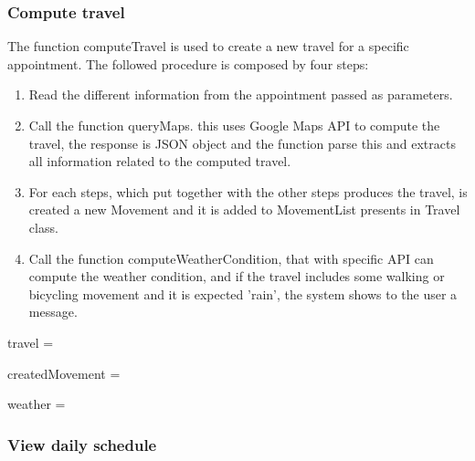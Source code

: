 \subsubsection{Compute travel}

The function computeTravel is used to create a new travel for a specific appointment.
The followed procedure is composed by four steps:
\begin{enumerate}
	\item Read the different information from the appointment passed as parameters.
	\item Call the function queryMaps. this uses Google Maps API to compute the travel, the response is JSON object and the function parse this and extracts all information related to the computed travel.
	\item For each steps, which put together with the other steps produces the travel, is created a new Movement and it is added to MovementList presents in Travel class.
	\item Call the function computeWeatherCondition, that with specific API can compute the weather condition, and if the travel includes some walking or bicycling movement and it is expected 'rain', the system shows to the user a message.
\end{enumerate}

\begin{algorithmic}
		
		\State {}
		\State {}
		\State {}
		\State {}
		\State {}
		
		\State travel =  
		
			\State createdMovement = 
			\State {}
		\EndFor
		
		weather = 
			\State {}
		\EndIf
	\EndFunction
\end{algorithmic}


\subsubsection{View daily schedule}

